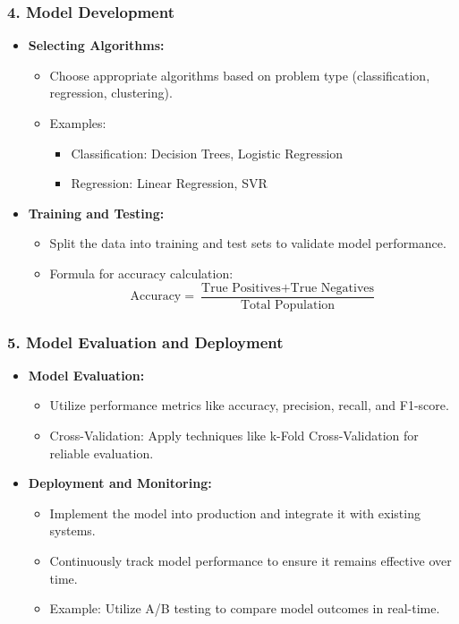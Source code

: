 \documentclass[aspectratio=169]{beamer}
\begin{document}
\begin{frame}[fragile]
    \frametitle{4. Model Development}
    
    \begin{itemize}
        \item \textbf{Selecting Algorithms:}
            \begin{itemize}
                \item Choose appropriate algorithms based on problem type (classification, regression, clustering).
                \item Examples:
                \begin{itemize}
                    \item Classification: Decision Trees, Logistic Regression
                    \item Regression: Linear Regression, SVR
                \end{itemize}
            \end{itemize}
        \item \textbf{Training and Testing:}
            \begin{itemize}
                \item Split the data into training and test sets to validate model performance.
                \item Formula for accuracy calculation:
                \begin{equation}
                \text{Accuracy} = \frac{\text{True Positives} + \text{True Negatives}}{\text{Total Population}}
                \end{equation}
            \end{itemize}
    \end{itemize}
\end{frame}

\begin{frame}[fragile]
    \frametitle{5. Model Evaluation and Deployment}
    
    \begin{itemize}
        \item \textbf{Model Evaluation:}
            \begin{itemize}
                \item Utilize performance metrics like accuracy, precision, recall, and F1-score.
                \item Cross-Validation: Apply techniques like k-Fold Cross-Validation for reliable evaluation.
            \end{itemize}
        \item \textbf{Deployment and Monitoring:}
            \begin{itemize}
                \item Implement the model into production and integrate it with existing systems.
                \item Continuously track model performance to ensure it remains effective over time.
                \item Example: Utilize A/B testing to compare model outcomes in real-time.
            \end{itemize}
    \end{itemize}
\end{frame}
\end{document}
